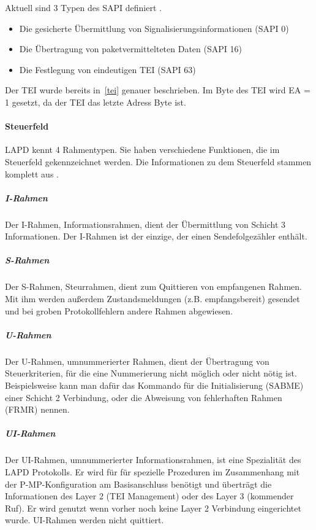\documentclass[12pt, a4paper, ngerman]{article}
\begin{document}
Aktuell sind 3 Typen des SAPI definiert \cite{SWB-098672061}. 
\begin{itemize}
	\item Die gesicherte Übermittlung von Signalisierungsinformationen (SAPI 0)
	\item Die Übertragung von paketvermittelteten Daten (SAPI 16)
	\item Die Festlegung von eindeutigen TEI (SAPI 63)
\end{itemize}



Der TEI wurde bereits in~\ref{tei} genauer beschrieben. Im Byte des TEI wird EA = 1 gesetzt, da der TEI das letzte Adress Byte ist.

\paragraph{Steuerfeld}
LAPD kennt 4 Rahmentypen. Sie haben verschiedene Funktionen, die im Steuerfeld gekennzeichnet werden. Die Informationen zu dem Steuerfeld stammen komplett aus \cite{SWB-098672061}.

\subparagraph{I-Rahmen}
Der I-Rahmen, Informationsrahmen, dient der Übermittlung von Schicht 3 Informationen. Der I-Rahmen ist der einzige, der einen Sendefolgezähler enthält.

\subparagraph{S-Rahmen}
Der S-Rahmen, Steurrahmen, dient zum Quittieren von empfangenen Rahmen. Mit ihm werden außerdem Zustandsmeldungen (z.B. empfangsbereit) gesendet und bei groben Protokollfehlern andere Rahmen abgewiesen.

\subparagraph{U-Rahmen}
Der U-Rahmen, umnummerierter Rahmen, dient der Übertragung von Steuerkriterien, für die eine Nummerierung nicht möglich oder nicht nötig ist. Beispielsweise kann man dafür das Kommando für die Initialisierung (SABME) einer Schicht 2 Verbindung, oder die Abweisung von fehlerhaften Rahmen (FRMR) nennen.

\subparagraph{UI-Rahmen}
Der UI-Rahmen, umnummerierter Informationsrahmen, ist eine Spezialität des LAPD Protokolls. Er wird für für spezielle Prozeduren im Zusammenhang mit der P-MP-Konfiguration am Basisanschluss benötigt und überträgt die Informationen des Layer 2 (TEI Management) oder des Layer 3 (kommender Ruf). Er wird genutzt wenn vorher noch keine Layer 2 Verbindung eingerichtet wurde. UI-Rahmen werden nicht quittiert.
\end{document}
